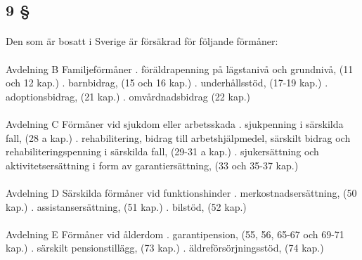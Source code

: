 \documentclass[a4paper,notitlepage,openany,10pt]{book}
\begin{document}
\subsection*{9 §}
\paragraph*{}
Den som är bosatt i Sverige är försäkrad för följande förmåner:
\paragraph*{}
Avdelning B Familjeförmåner
. föräldrapenning på lägstanivå
och grundnivå, (11 och 12 kap.)
. barnbidrag, (15 och 16 kap.)
. underhållsstöd, (17-19 kap.)
. adoptionsbidrag, (21 kap.)
. omvårdnadsbidrag (22 kap.)
\paragraph*{}
Avdelning C Förmåner vid sjukdom eller arbetsskada
. sjukpenning i särskilda fall, (28 a kap.)
. rehabilitering, bidrag till arbetshjälpmedel, särskilt bidrag och rehabiliteringspenning i
särskilda fall, (29-31 a kap.)
. sjukersättning och aktivitetsersättning i form av
garantiersättning, (33 och 35-37 kap.)
\paragraph*{}
Avdelning D Särskilda förmåner vid funktionshinder
. merkostnadsersättning, (50 kap.)
. assistansersättning, (51 kap.)
. bilstöd, (52 kap.)
\paragraph*{}
Avdelning E Förmåner vid ålderdom
. garantipension, (55, 56, 65-67 och
69-71 kap.)
. särskilt pensionstillägg, (73 kap.)
. äldreförsörjningsstöd, (74 kap.)
\end{document}
